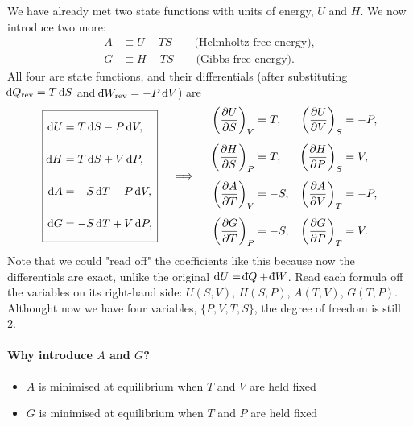 We have already met two state functions with units of energy, $U$ and $H$. We now introduce two more:
\begin{align*}
    A &\equiv U - TS \qquad \text{(Helmholtz free energy)},\\
    G &\equiv H - TS \qquad \text{(Gibbs free energy)}.
\end{align*}
All four are state functions, and their differentials (after substituting $\dbar Q_{\text{rev}}=T\,\dd S$ and $\dbar W_{\text{rev}}=-P\,\dd V$) are
\[
    \boxed{\begin{aligned}
        \dd U &= T\,\dd S - P\,\dd V, \vphantom{\left(\frac{\partial U}{\partial S}\right)_V} \\
        \dd H &= T\,\dd S + V\,\dd P, \vphantom{\left(\frac{\partial H}{\partial S}\right)_P} \\
        \dd A &= -S\,\dd T - P\,\dd V, \vphantom{\left(\frac{\partial A}{\partial T}\right)_V} \\
        \dd G &= -S\,\dd T + V\,\dd P, \vphantom{\left(\frac{\partial G}{\partial T}\right)_P}
    \end{aligned}}
    \quad\implies\quad
    \begin{aligned}
        \left(\frac{\partial U}{\partial S}\right)_V &= T, & \left(\frac{\partial U}{\partial V}\right)_S &= -P, \\[1ex]
        \left(\frac{\partial H}{\partial S}\right)_P &= T, & \left(\frac{\partial H}{\partial P}\right)_S &= V, \\[1ex]
        \left(\frac{\partial A}{\partial T}\right)_V &= -S, & \left(\frac{\partial A}{\partial V}\right)_T &= -P, \\[1ex]
        \left(\frac{\partial G}{\partial T}\right)_P &= -S, & \left(\frac{\partial G}{\partial P}\right)_T &= V.
    \end{aligned}
\]
Note that we could "read off" the coefficients like this because now the differentials are exact, unlike the original $\dd U = \dbar Q + \dbar W$.
Read each formula off the variables on its right-hand side: $U(S,V)$, $H(S,P)$, $A(T,V)$, $G(T,P)$. 
Althought now we have four variables, $\{P,V,T,S\}$, the degree of freedom is still 2. 

\paragraph{Why introduce $A$ and $G$?}
\begin{itemize}
    \item $A$ is minimised at equilibrium when $T$ and $V$ are held fixed 
    \item $G$ is minimised at equilibrium when $T$ and $P$ are held fixed
\end{itemize}

